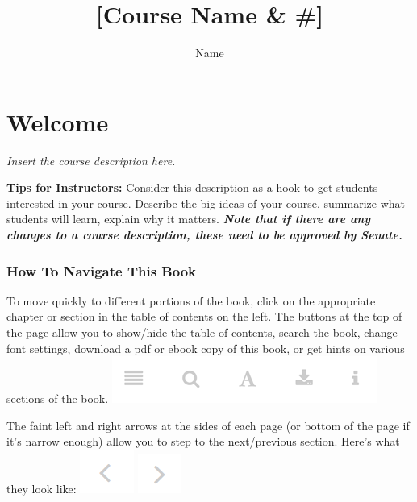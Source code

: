 \documentclass[
]{book}
\title{{[}Course Name \& \#{]}}
\author{Name}
\date{}
\begin{document}
\maketitle

{
\setcounter{tocdepth}{1}
\tableofcontents
}
\hypertarget{welcome}{%
\chapter*{Welcome}\label{welcome}}

\emph{Insert the course description here.}

\begin{feedback}
\textbf{Tips for Instructors:} Consider this description as a hook to
get students interested in your course. Describe the big ideas of your
course, summarize what students will learn, explain why it matters.
\textbf{\emph{Note that if there are any changes to a course
description, these need to be approved by Senate.}}
\end{feedback}

\hypertarget{how-to-navigate-this-book}{%
\subsection*{How To Navigate This Book}\label{how-to-navigate-this-book}}

To move quickly to different portions of the book, click on the appropriate chapter or section in the table of contents on the left. The buttons at the top of the page allow you to show/hide the table of contents, search the book, change font settings, download a pdf or ebook copy of this book, or get hints on various sections of the book.
\includegraphics{assets/course-intro/menu.png}

The faint left and right arrows at the sides of each page (or bottom of the page if it's narrow enough) allow you to step to the next/previous section. Here's what they look like:
\includegraphics{assets/course-intro/left_arrow.png} \includegraphics{assets/course-intro/right_arrow.png}
\end{document}
